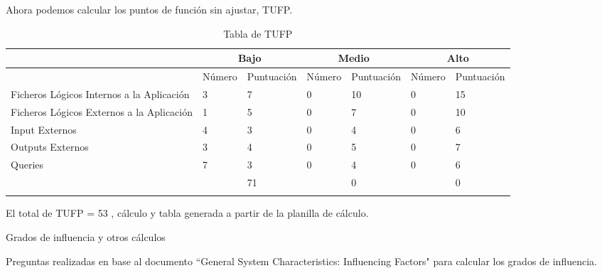    Ahora podemos calcular los puntos de función sin ajustar, TUFP.
   
   \begin{longtable}{|p{3cm}|p{1.5cm}|p{1.9cm}|p{1.5cm}|p{1.9cm}|p{1.5cm}|p{1.9cm}|}
   \hline 
     & \multicolumn{2}{c|}{Bajo} & \multicolumn{2}{c|}{Medio} & \multicolumn{2}{c|}{Alto} \\ 
   \hline 
     & Número & Puntuación & Número & Puntuación & Número & Puntuación \\ 
   \hline 
   Ficheros Lógicos Internos a la Aplicación & 3 & 7 & 0 & 10 & 0 & 15 \\ 
   \hline 
   Ficheros Lógicos Externos a la Aplicación
    & 1 & 5 & 0 & 7 & 0 & 10 \\ 
   \hline 
   Input Externos & 4 & 3 & 0 & 4 & 0 & 6 \\ 
   \hline 
   Outputs Externos
    & 3 & 4 & 0 & 5 & 0 & 7 \\ 
   \hline 
   Queries & 7 & 3 & 0 & 4 & 0 & 6 \\ 
   \hline 
     &   & 71 &   & 0 &   & 0 \\ 
   \hline 
   \caption{Tabla de TUFP}
   \label{tab9} 
   \end{longtable} 
   
   El total de TUFP = 53 , cálculo y tabla generada a partir de la planilla de cálculo.
   
   Grados de influencia y otros cálculos
   
   Preguntas realizadas en base al documento ``General System Characteristics: Influencing Factors" para calcular los grados de influencia.
   
